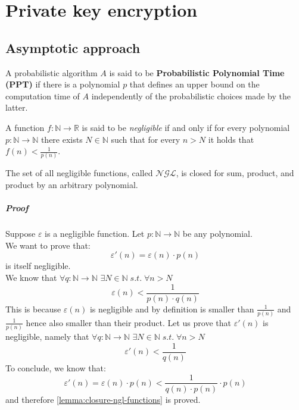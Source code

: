 \documentclass[../main]{subfiles}
\begin{document}
\chapter{Private key encryption}

\section{Asymptotic approach}

\begin{definition}
    A probabilistic algorithm $A$ is said to be \textbf{Probabilistic Polynomial Time (PPT)} if there is a polynomial $p$ that defines an upper bound on the computation time
    of $A$ independently of the probabilistic choices made by the latter.
\end{definition}

\begin{definition}
    A function $f: \mathbb{N} \rightarrow{} \mathbb{R}$ is said to be \textit{negligible} if and only if for every polynomial $p: \mathbb{N} \rightarrow{} \mathbb{N}$
    there exists $N \in{} \mathbb{N}$ such that for every $n > N$ it holds that $f(n) < \frac{1}{p(n)}$.
\end{definition}

\begin{lemma}
    \label{lemma:closure-ngl-functions}
    The set of all negligible functions, called $\mathcal{NGL}$, is closed for sum, product, and product by an arbitrary polynomial.
\end{lemma}

\paragraph{Proof}
Suppose $\varepsilon$ is a negligible function. Let $p: \mathbb{N} \rightarrow{} \mathbb{N}$ be any polynomial.\\
We want to prove that:
$$\varepsilon'(n) = \varepsilon(n)\cdot{}p(n)$$
is itself negligible.\\
We know that $\forall{} q: \mathbb{N} \rightarrow{} \mathbb{N}$ $\exists{} N \in{} \mathbb{N}\; s.t.\;\forall{} n > N$
$$\varepsilon(n) < \frac{1}{p(n)\cdot{}q(n)}$$
This is because $\varepsilon(n)$ is negligible and by definition is smaller than $\frac{1}{p(n)}$ and $\frac{1}{p(n)}$ hence also smaller than their product.
Let us prove that $\varepsilon'(n)$ is negligible, namely that $\forall{} q: \mathbb{N} \rightarrow{} \mathbb{N}$ $\exists{} N \in{} \mathbb{N}\; s.t.\;\forall{} n > N$
$$\varepsilon'(n) < \frac{1}{q(n)}$$
To conclude, we know that:
$$\varepsilon'(n) = \varepsilon(n) \cdot{} p(n) < \frac{1}{q(n)\cdot{}p(n)} \cdot{} p(n)$$
and therefore \ref{lemma:closure-ngl-functions} is proved.
\end{document}
